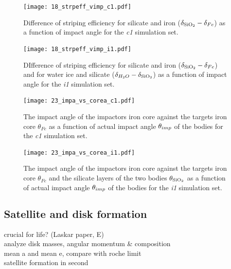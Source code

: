 \begin{landscape}
\begin{figure}[htbp]
\begin{center}
\texttt{[image: 18\_strpeff\_vimp\_c1.pdf]}
\caption{Difference of striping efficiency for silicate and iron ($\delta_{\mathrm{SiO}_2} - \delta_{Fe}$) as a function of impact angle for the \emph{c1} simulation set.}
\label{ch03_fig18a}
\end{center}
\end{figure}

\begin{figure}[htbp]
\begin{center}
\texttt{[image: 18\_strpeff\_vimp\_i1.pdf]}
\caption{DIfference of striping efficiency for silicate and iron ($\delta_{\mathrm{SiO}_2} - \delta_{Fe}$) and for water ice and silicate ($\delta_{H_2 O} - \delta_{\mathrm{SiO}_2}$) as a function of impact angle for the \emph{i1} simulation set.}
\label{ch03_fig19a}
\end{center}
\end{figure}

\begin{figure}[htbp]
\begin{center}
\texttt{[image: 23\_impa\_vs\_corea\_c1.pdf]}
\caption{The impact angle of the impactors iron core against the targets iron core $\theta_{Fe}$ as a function of actual impact angle $\theta_{imp}$ of the bodies for the \emph{c1} simulation set.}
\label{ch03_fig23a}
\end{center}
\end{figure}

\begin{figure}[htbp]
\begin{center}
\texttt{[image: 23\_impa\_vs\_corea\_i1.pdf]}
\caption{The impact angle of the impactors iron core against the targets iron core $\theta_{Fe}$ and the silicate layers of the two bodies $\theta_{\mathrm{SiO}_2}$ as a function of actual impact angle $\theta_{imp}$ of the bodies for the \emph{i1} simulation set.}
\label{ch03_fig23b}
\end{center}
\end{figure}
\end{landscape}




\subsection{Satellite and disk formation}
crucial for life? (Laskar paper, E)\\
analyze disk masses, angular momentum \& composition \\
mean a and mean e, compare with roche limit \\
satellite formation in second \\

